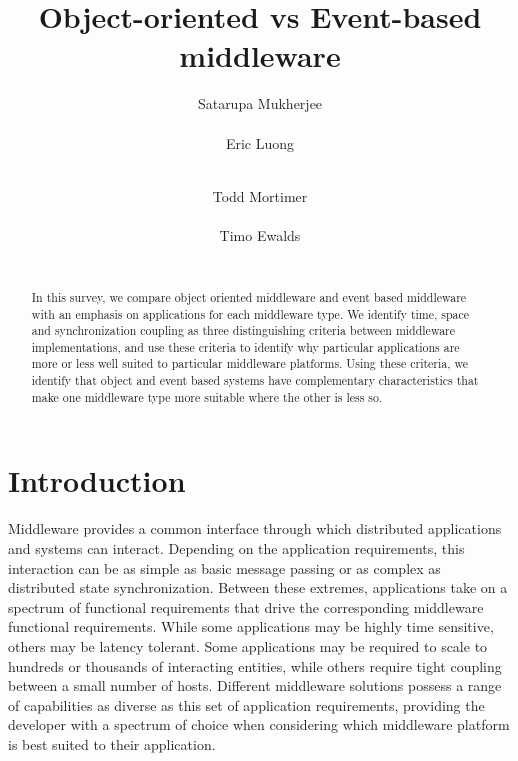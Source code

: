 \documentclass{acm_proc_article-sp}
\begin{document}
\title{Object-oriented vs Event-based middleware}


\author{
\alignauthor
Satarupa Mukherjee \\
       \\
\alignauthor
Eric Luong \\
       \\
\and  
\alignauthor 
Todd Mortimer \\
       \\
\alignauthor 
Timo Ewalds\\
      \\
}


\maketitle
\begin{abstract}

In this survey, we compare object oriented middleware and event based middleware with an emphasis on applications for each middleware type. We identify time, space and synchronization coupling as three distinguishing criteria between middleware implementations, and use these criteria to identify why particular applications are more or less well suited to particular middleware platforms. Using these criteria, we identify that object and event based systems have complementary characteristics that make one middleware type more suitable where the other is less so. 

\end{abstract}


\section{Introduction}
\label{sec:intro}


Middleware provides a common interface through which distributed applications and systems can interact. Depending on the application requirements, this interaction can be as simple as basic message passing or as complex as distributed state synchronization. Between these extremes, applications take on a spectrum of functional requirements that drive the corresponding middleware functional requirements. While some applications may be highly time sensitive, others may be latency tolerant. Some applications may be required to scale to hundreds or thousands of interacting entities, while others require tight coupling between a small number of hosts. Different middleware solutions possess a range of capabilities as diverse as this set of application requirements, providing the developer with a spectrum of choice when considering which middleware platform is best suited to their application.
\end{document}

